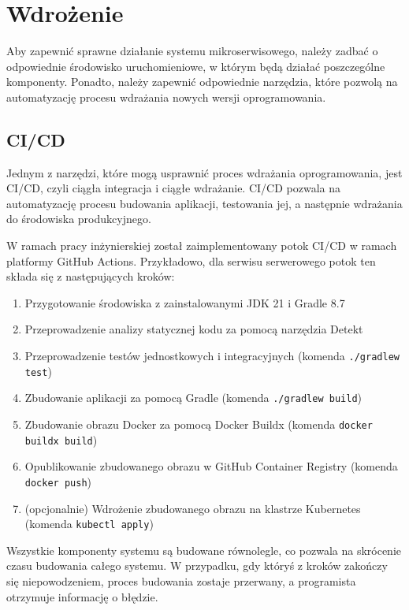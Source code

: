 \clearpage %

\section{Wdrożenie}

Aby zapewnić sprawne działanie systemu mikroserwisowego, należy zadbać o odpowiednie środowisko uruchomieniowe, w którym będą działać poszczególne komponenty. Ponadto, należy zapewnić odpowiednie narzędzia, które pozwolą na automatyzację procesu wdrażania nowych wersji oprogramowania.

\subsection{CI/CD}

Jednym z narzędzi, które mogą usprawnić proces wdrażania oprogramowania, jest CI/CD, czyli ciągła integracja i ciągłe wdrażanie. CI/CD pozwala na automatyzację procesu budowania aplikacji, testowania jej, a następnie wdrażania do środowiska produkcyjnego.

W ramach pracy inżynierskiej został zaimplementowany potok CI/CD w ramach platformy GitHub Actions. Przykładowo, dla serwisu serwerowego potok ten składa się z następujących kroków:

\begin{enumerate}
    \item Przygotowanie środowiska z zainstalowanymi JDK 21 i Gradle \cite{gradle} 8.7
    \item Przeprowadzenie analizy statycznej kodu za pomocą narzędzia Detekt \cite{detekt}
    \item Przeprowadzenie testów jednostkowych i integracyjnych (komenda \texttt{./gradlew test})
    \item Zbudowanie aplikacji za pomocą Gradle (komenda \texttt{./gradlew build})
    \item Zbudowanie obrazu Docker za pomocą Docker Buildx (komenda \texttt{docker buildx build})
    \item Opublikowanie zbudowanego obrazu w GitHub Container Registry \cite{ghcr} (komenda \texttt{docker push})
    \item (opcjonalnie) Wdrożenie zbudowanego obrazu na klastrze Kubernetes (komenda \texttt{kubectl apply})
\end{enumerate}

Wszystkie komponenty systemu są budowane równolegle, co pozwala na skrócenie czasu budowania całego systemu. W przypadku, gdy któryś z kroków zakończy się niepowodzeniem, proces budowania zostaje przerwany, a programista otrzymuje informację o błędzie.

